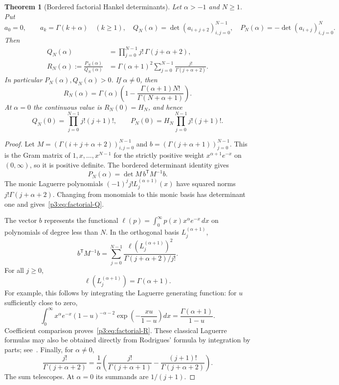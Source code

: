 \documentclass[11pt,a4paper]{article}
\newtheorem{theorem}{Theorem}[section]
\theoremstyle{definition}
\theoremstyle{remark}
\numberwithin{equation}{section}
\begin{document}
\begin{theorem}[Bordered factorial Hankel determinants]
\label{p3:thm:factorial-border}
Let $\alpha>-1$ and $N\ge1$. Put
\[
 a_0=0,\qquad a_k=\Gamma(k+\alpha)\quad(k\ge1),
 \quad Q_N(\alpha)=\det(a_{i+j+2})_{i,j=0}^{N-1},
 \quad P_N(\alpha)=-\det(a_{i+j})_{i,j=0}^{N}.
\]
Then
\begin{align}
 Q_N(\alpha)&=\prod_{j=0}^{N-1}j!\,\Gamma(j+\alpha+2),
 \label{p3:eq:factorial-Q}\\
 R_N(\alpha):=\frac{P_N(\alpha)}{Q_N(\alpha)}
 &=\Gamma(\alpha+1)^2
       \sum_{j=0}^{N-1}\frac{j!}{\Gamma(j+\alpha+2)}.
 \label{p3:eq:factorial-R}
\end{align}
In particular $P_N(\alpha),Q_N(\alpha)>0$. If $\alpha\ne0$, then
\[
 R_N(\alpha)=\Gamma(\alpha)
 \left(1-\frac{\Gamma(\alpha+1)N!}{\Gamma(N+\alpha+1)}\right).
\]
At $\alpha=0$ the continuous value is $R_N(0)=H_N$, and hence
\[
 Q_N(0)=\prod_{j=0}^{N-1}j!(j+1)!,\qquad
 P_N(0)=H_N\prod_{j=0}^{N-1}j!(j+1)!.
\]
\end{theorem}

\begin{proof}
Let $M=(\Gamma(i+j+\alpha+2))_{i,j=0}^{N-1}$ and
$b=(\Gamma(j+\alpha+1))_{j=0}^{N-1}$. This is the Gram matrix of
$1,x,\ldots,x^{N-1}$ for the strictly positive weight
$x^{\alpha+1}e^{-x}$ on $(0,\infty)$, so it is positive definite.
The bordered determinant identity gives
\[
 P_N(\alpha)=\det M\,b^{\mathsf T}M^{-1}b.
\]
The monic Laguerre polynomials
$(-1)^j j!L_j^{(\alpha+1)}(x)$ have squared norms
$j!\Gamma(j+\alpha+2)$. Changing from monomials to this monic basis
has determinant one and gives~\eqref{p3:eq:factorial-Q}.

The vector $b$ represents the functional
$\ell(p)=\int_0^\infty p(x)x^\alpha e^{-x}\,dx$ on polynomials of
degree less than $N$. In the orthogonal basis $L_j^{(\alpha+1)}$,
\[
 b^{\mathsf T}M^{-1}b
 =\sum_{j=0}^{N-1}
 \frac{\ell(L_j^{(\alpha+1)})^2}
 {\Gamma(j+\alpha+2)/j!}.
\]
For all $j\ge0$,
\[
 \ell(L_j^{(\alpha+1)})=\Gamma(\alpha+1).
\]
For example, this follows by integrating the Laguerre generating
function: for $u$ sufficiently close to zero,
\[
 \int_0^\infty x^\alpha e^{-x}
   (1-u)^{-\alpha-2}
   \exp\left(-\frac{xu}{1-u}\right)dx
 =\frac{\Gamma(\alpha+1)}{1-u}.
\]
Coefficient comparison proves~\eqref{p3:eq:factorial-R}. These classical
Laguerre formulas may also be obtained directly from Rodrigues'
formula by integration by parts; see~\cite[Sections~18.3, 18.12]{p3:DLMF}.
Finally, for $\alpha\ne0$,
\[
 \frac{j!}{\Gamma(j+\alpha+2)}
 =\frac1\alpha\left(
 \frac{j!}{\Gamma(j+\alpha+1)}
 -\frac{(j+1)!}{\Gamma(j+\alpha+2)}\right).
\]
The sum telescopes. At $\alpha=0$ its summands are $1/(j+1)$.
\end{proof}
\end{document}
